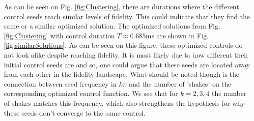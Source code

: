 \documentclass[a4paper, twocolumn]{revtex4-1}
\begin{document}
As can be seen on Fig. \ref{fig:Clustering}, there are durations where the different control seeds reach similar levels of fidelity. This could indicate that they find the same or a similar optimized solution. The optimized solutions from Fig. \ref{fig:Clustering} with control duration $T\approx 0.685$ms are shown in Fig. \ref{fig:similarSolutions}. As can be seen on this figure, these optimized controls do not look alike despite reaching fidelity. It is most likely due to how different their initial control seeds are and so, one could argue that these seeds are located away from each other in the fidelity landscape. What should be noted though is the connection between seed frequency in $k\pi$ and the number of 'shakes' on the corresponding optimized control function. We see that for $k=2,3,4$ the number of shakes matches this frequency, which also strengthens the hypothesis for why these seeds don't converge to the same control. \\
\end{document}
